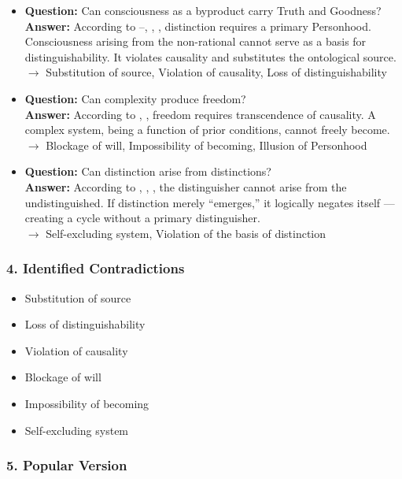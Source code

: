 \documentclass[12pt]{article}
\begin{document}
\begin{itemize}
\item \textbf{Question:} Can consciousness as a byproduct carry Truth and Goodness?\\
\textbf{Answer:} According to \text{[1]}–\text{[3]}, \text{[11.2]}, \text{[12.2]}, distinction requires a primary Personhood. Consciousness arising from the non-rational cannot serve as a basis for distinguishability. It violates causality and substitutes the ontological source.\\
$\rightarrow$ Substitution of source, Violation of causality, Loss of distinguishability

\item \textbf{Question:} Can complexity produce freedom?\\
\textbf{Answer:} According to \text{[12.2]}, \text{[12.3]}, freedom requires transcendence of causality. A complex system, being a function of prior conditions, cannot freely become.\\
$\rightarrow$ Blockage of will, Impossibility of becoming, Illusion of Personhood

\item \textbf{Question:} Can distinction arise from distinctions?\\
\textbf{Answer:} According to \text{[1]}, \text{[3]}, \text{[11.1]}, the distinguisher cannot arise from the undistinguished. If distinction merely ``emerges,'' it logically negates itself — creating a cycle without a primary distinguisher.\\
$\rightarrow$ Self-excluding system, Violation of the basis of distinction
\end{itemize}

\subsubsection*{4. Identified Contradictions}

\begin{itemize}
\item Substitution of source
\item Loss of distinguishability
\item Violation of causality
\item Blockage of will
\item Impossibility of becoming
\item Self-excluding system
\end{itemize}

\subsubsection*{5. Popular Version}
\end{document}
